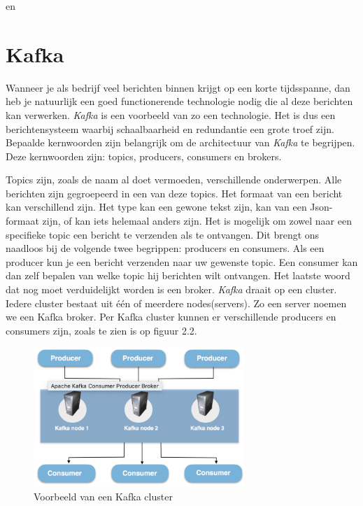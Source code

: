  \autocite{Claudio2017} en \autocite{Velthoven2016}

\section{Kafka}

Wanneer je als bedrijf veel berichten binnen krijgt op een korte tijdsspanne, dan heb je natuurlijk een goed functionerende technologie nodig die al deze berichten kan verwerken. \emph{Kafka} is een voorbeeld van zo een technologie. Het is dus een berichtensysteem waarbij schaalbaarheid en redundantie een grote troef zijn. Bepaalde kernwoorden zijn belangrijk om de architectuur van \emph{Kafka} te begrijpen. Deze kernwoorden zijn: topics, producers, consumers en brokers.  

Topics zijn, zoals de naam al doet vermoeden, verschillende onderwerpen. Alle berichten zijn gegroepeerd in een van deze topics. Het formaat van een bericht kan verschillend zijn. Het type kan een gewone tekst zijn, kan van een Json-formaat zijn, of kan iets helemaal anders zijn. Het is mogelijk om zowel naar een specifieke topic een bericht te verzenden als te ontvangen. Dit brengt ons naadloos bij de volgende twee begrippen: producers en consumers. Als een producer kun je een bericht verzenden naar uw gewenste topic. Een consumer kan dan zelf bepalen van welke topic hij berichten wilt ontvangen. Het laatste woord dat nog moet verduidelijkt worden is een broker. \emph{Kafka} draait op een cluster. Iedere cluster bestaat uit één of meerdere nodes(servers). Zo een server noemen we een Kafka broker. Per Kafka cluster kunnen er verschillende producers en consumers zijn, zoals te zien is op figuur 2.2. 

\begin{figure}[h!]
    \centering
    \includegraphics[width=80mm]{../kafkaCluster.png}
    \caption{Voorbeeld van een Kafka cluster}
    
\end{figure}

